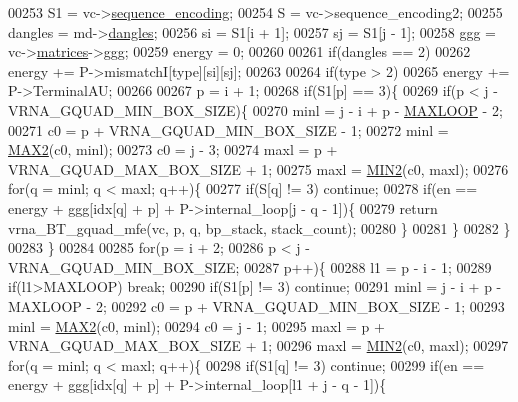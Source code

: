 \begin{DoxyCode}
00253   S1          = vc->\hyperlink{group__fold__compound_a9934bdb695d35a3544285cbcc19f9763}{sequence\_encoding};
00254   S           = vc->sequence\_encoding2;
00255   dangles     = md->\hyperlink{structvrna__md__s_adcda4ff2ea77748ae0e8700288282efc}{dangles};
00256   si          = S1[i + 1];
00257   sj          = S1[j - 1];
00258   ggg         = vc->\hyperlink{group__fold__compound_aca8be7bdc65bafe2172c6ee777f18568}{matrices}->\hyperlink{group__dp__matrices_a0b7b86a5c75c96eabb89eb53a13e7164}{ggg};
00259   energy      = 0;
00260 
00261   \textcolor{keywordflow}{if}(dangles == 2)
00262     energy += P->mismatchI[type][si][sj];
00263 
00264   \textcolor{keywordflow}{if}(type > 2)
00265     energy += P->TerminalAU;
00266 
00267   p = i + 1;
00268   \textcolor{keywordflow}{if}(S1[p] == 3)\{
00269     \textcolor{keywordflow}{if}(p < j - VRNA\_GQUAD\_MIN\_BOX\_SIZE)\{
00270       minl  = j - i + p - \hyperlink{energy__const_8h_ad1bd6eabac419670ddd3c9ed82145988}{MAXLOOP} - 2;
00271       c0    = p + VRNA\_GQUAD\_MIN\_BOX\_SIZE - 1;
00272       minl  = \hyperlink{group__utils_gadd91367918fadbc8d585940d6206d6d2}{MAX2}(c0, minl);
00273       c0    = j - 3;
00274       maxl  = p + VRNA\_GQUAD\_MAX\_BOX\_SIZE + 1;
00275       maxl  = \hyperlink{group__utils_ga2dd4a927a7f937f43a90c144d79107d8}{MIN2}(c0, maxl);
00276       \textcolor{keywordflow}{for}(q = minl; q < maxl; q++)\{
00277         \textcolor{keywordflow}{if}(S[q] != 3) \textcolor{keywordflow}{continue};
00278         \textcolor{keywordflow}{if}(en == energy + ggg[idx[q] + p] + P->internal\_loop[j - q - 1])\{
00279           \textcolor{keywordflow}{return} vrna\_BT\_gquad\_mfe(vc, p, q, bp\_stack, stack\_count);
00280         \}
00281       \}
00282     \}
00283   \}
00284 
00285   \textcolor{keywordflow}{for}(p = i + 2;
00286       p < j - VRNA\_GQUAD\_MIN\_BOX\_SIZE;
00287       p++)\{
00288     l1    = p - i - 1;
00289     \textcolor{keywordflow}{if}(l1>MAXLOOP) \textcolor{keywordflow}{break};
00290     \textcolor{keywordflow}{if}(S1[p] != 3) \textcolor{keywordflow}{continue};
00291     minl  = j - i + p - MAXLOOP - 2;
00292     c0    = p + VRNA\_GQUAD\_MIN\_BOX\_SIZE - 1;
00293     minl  = \hyperlink{group__utils_gadd91367918fadbc8d585940d6206d6d2}{MAX2}(c0, minl);
00294     c0    = j - 1;
00295     maxl  = p + VRNA\_GQUAD\_MAX\_BOX\_SIZE + 1;
00296     maxl  = \hyperlink{group__utils_ga2dd4a927a7f937f43a90c144d79107d8}{MIN2}(c0, maxl);
00297     \textcolor{keywordflow}{for}(q = minl; q < maxl; q++)\{
00298       \textcolor{keywordflow}{if}(S1[q] != 3) \textcolor{keywordflow}{continue};
00299       \textcolor{keywordflow}{if}(en == energy + ggg[idx[q] + p] + P->internal\_loop[l1 + j - q - 1])\{

\end{DoxyCode}
